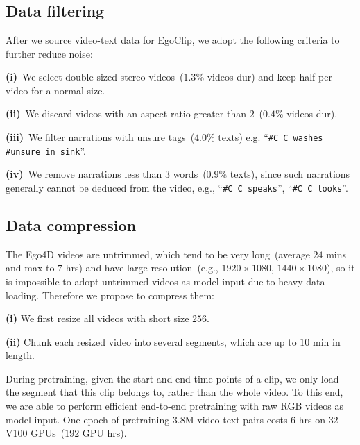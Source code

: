 \documentclass{article}
\newcommand{\dataset}{EgoClip}
\begin{document}
\section{\seca}\label{a}
\subsection{Data filtering}\label{a1}
After we source video-text data for \dataset, we adopt the following criteria to further reduce noise:

\textbf{(i)}~We select double-sized stereo videos~($1.3\%$ videos dur) and keep half per video for a normal size. 


\textbf{(ii)}~We discard videos with an aspect ratio greater than $2$~($0.4\%$ videos dur).


\textbf{(iii)}~We filter narrations with unsure tags~($4.0\%$ texts) e.g. ``\texttt{\#C C washes \#unsure in sink}''.

\textbf{(iv)}~We remove narrations less than $3$ words~($0.9\%$ texts),
since such narrations generally cannot be deduced from the video, 
e.g., ``\texttt{\#C C speaks}'', ``\texttt{\#C C looks}''.



\subsection{Data compression}\label{a2}
The Ego4D videos are untrimmed, 
which tend to be very long~(average $24$ mins and max to $7$ hrs) and have large resolution~(e.g., $1920\times 1080$, $1440\times 1080$),
so it is impossible to adopt untrimmed videos as model input due to heavy data loading. 
Therefore we propose to compress them:

\textbf{(i)} We first resize all videos with short size $256$.

\textbf{(ii)} Chunk each resized video into several segments, which are up to $10$ min in length.

During pretraining, given the start and end time points of a clip, we only load the segment that this clip belongs to, rather than the whole video. 
To this end, we are able to perform efficient end-to-end pretraining with raw RGB videos as model input. 
One epoch of pretraining $3.8\text{M}$ video-text pairs costs $6$ hrs on $32$ V100 GPUs~($192$ GPU hrs).
\end{document}
